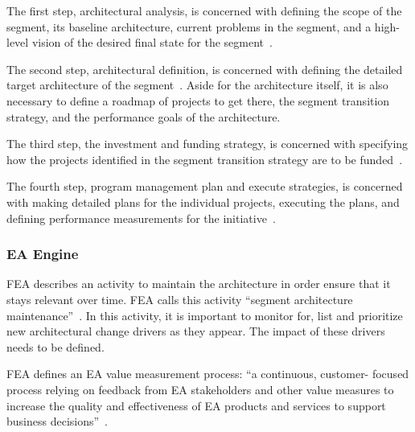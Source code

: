 The first step, architectural analysis, is concerned with defining the scope of the segment, its baseline architecture, current problems in the segment, and a high-level vision of the desired final state for the segment~\cite{FEA_PMO2007}.

The second step, architectural definition, is concerned with defining the detailed target architecture of the segment~\cite{FEA_PMO2007}. Aside for the architecture itself, it is also necessary to define a roadmap of projects to get there, the segment transition strategy, and the performance goals of the architecture. 
  
The third step, the investment and funding strategy, is concerned with specifying how the projects identified in the segment transition strategy are to be funded~\cite{FEA_PMO2007}. 

The fourth step, program management plan and execute strategies, is concerned with making detailed plans for the individual projects, executing the plans, and defining performance measurements for the initiative~\cite{FEA_PMO2007}.

    
\subsubsection{EA Engine}

FEA describes an activity to maintain the architecture in order ensure that it stays relevant over time. FEA calls this activity ``segment architecture maintenance''~\cite{FEA_PMO2007}. In this activity, it is important to monitor for, list and prioritize new architectural change drivers as they appear. The impact of these drivers needs to be defined. 


FEA  defines  an EA value measurement process: ``a continuous, customer- focused process relying on feedback from EA stakeholders and other value measures to increase the quality and effectiveness of EA products and services to support business decisions''~\cite[Sec. 5]{FEA_PMO2007}.


